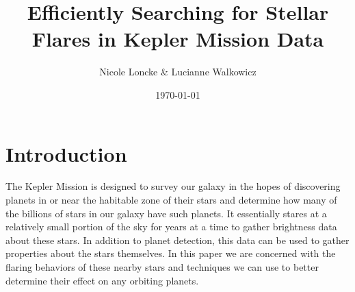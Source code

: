 \documentclass[11pt]{article}
\author{Nicole Loncke \& Lucianne Walkowicz}
\date{\today}
\title{Efficiently Searching for Stellar Flares in Kepler Mission Data}
\begin{document}
\maketitle{}

\section{Introduction}
\label{sec:intro}

The Kepler Mission is designed to survey our galaxy in the hopes of
discovering planets in or near the habitable zone of their stars and
determine how many of the billions of stars in our galaxy have such
planets. It essentially stares at a relatively small portion of the
sky for years at a time to gather brightness data about these stars.
In addition to planet detection, this data can be used to gather
properties about the stars themselves.  In this paper we are concerned
with the flaring behaviors of these nearby stars and techniques we can
use to better determine their effect on any orbiting planets.



\end{document}
